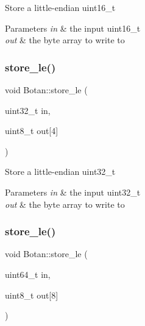 Store a little-\/endian uint16\+\_\+t 
\begin{DoxyParams}{Parameters}
{\em in} & the input uint16\+\_\+t \\
\hline
{\em out} & the byte array to write to \\
\hline
\end{DoxyParams}
\mbox{\label{namespace_botan_aced6f16a306b58cc117c3a03e04cf788}} 
\subsubsection{\texorpdfstring{store\+\_\+le()}{store\_le()}\hspace{0.1cm}{\footnotesize\ttfamily [2/6]}}
{\footnotesize\ttfamily void Botan\+::store\+\_\+le (\begin{DoxyParamCaption}\item[{uint32\+\_\+t}]{in,  }\item[{uint8\+\_\+t}]{out\mbox{[}4\mbox{]} }\end{DoxyParamCaption})\hspace{0.3cm}{\ttfamily [inline]}}

Store a little-\/endian uint32\+\_\+t 
\begin{DoxyParams}{Parameters}
{\em in} & the input uint32\+\_\+t \\
\hline
{\em out} & the byte array to write to \\
\hline
\end{DoxyParams}
\mbox{\label{namespace_botan_ac123595229ef6588f851540b9b774800}} 
\subsubsection{\texorpdfstring{store\+\_\+le()}{store\_le()}\hspace{0.1cm}{\footnotesize\ttfamily [3/6]}}
{\footnotesize\ttfamily void Botan\+::store\+\_\+le (\begin{DoxyParamCaption}\item[{uint64\+\_\+t}]{in,  }\item[{uint8\+\_\+t}]{out\mbox{[}8\mbox{]} }\end{DoxyParamCaption})\hspace{0.3cm}{\ttfamily [inline]}}

